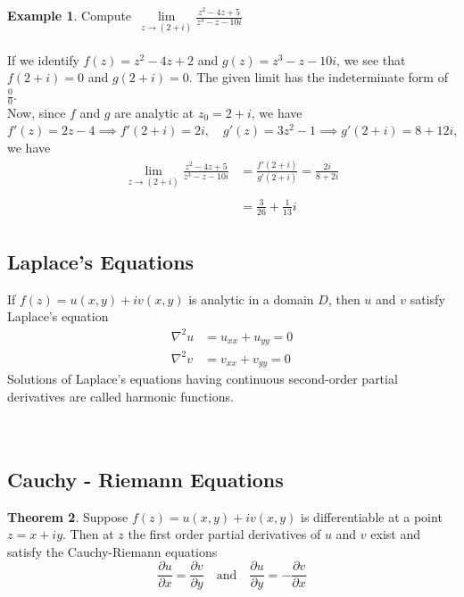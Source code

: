 \documentclass[11pt,a4paper]{article}
\theoremstyle{definition}
\newtheorem{thm}{Theorem}[section]
\newtheorem{example}[thm]{Example}
\begin{document}
\begin{example}
Compute $\,\lim\limits_{z \rightarrow (2 + i)}\frac{z^2 - 4z + 5}{z^3 - z - 10i}$\\

\text{\textcolor{red}{Solution}}\\
If we identify $f(z) = z^2 - 4z + 2$ and $g(z ) = z^3  - z - 10i$, we see that $f(2 + i) = 0$ and $g(2 + i) = 0$. The given limit has the indeterminate form of $\frac{0}{0}$.\\
Now, since $f$ and $g$ are analytic at $z_0 = 2 + i$, we have\\ $f'(z) = 2z  - 4\implies f'(2 + i) = 2i,\quad  g'(z) = 3z^2 - 1 \implies g'(2 + i) = 8 + 12i,$ we have
\begin{align*}
\lim\limits_{z \rightarrow (2  + i)} \frac{z^2 - 4z + 5}{z^3 - z - 10i} & = \frac{f'(2 + i)}{g'(2 + i)}= \frac{2i}{8 + 2i}\\\\
& = \frac{3}{26} + \frac{1}{13}i\\
\end{align*}
\end{example}

{\color[wave]{485}\subsection{Laplace's Equations}}
If $f(z) = u(x,y) + iv(x,y)$ is analytic in a domain  $D$, then $u$ and $v$  satisfy Laplace's equation
\begin{align*}
\nabla^2 u & = u_{xx} + u_{yy} = 0\\
\nabla^2v  & = v_{xx} + v_{yy} = 0
\end{align*}
Solutions of Laplace's equations  having continuous second-order partial derivatives are called harmonic functions.\\\\\\







{\color[wave]{485}\subsection{Cauchy - Riemann Equations}}

\begin{thm}
Suppose $f(z) = u(x,y) + iv(x,y)$ is differentiable at a point $z = x + iy$. Then at $z$ the first order partial derivatives of $u$ and $v$ exist and satisfy the Cauchy-Riemann equations $$\frac{\partial u}{\partial x} = \frac{\partial v}{\partial y}\quad \text{and}\quad  \frac{\partial u}{\partial y} = -\frac{\partial v}{\partial x}$$
\end{thm}
\end{document}
